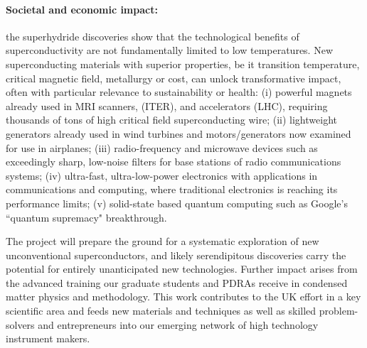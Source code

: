 \paragraph{Societal and economic impact:}
the superhydride discoveries show that the technological benefits of superconductivity are not fundamentally limited to low temperatures. 
New superconducting materials with superior properties, be it transition temperature,
critical magnetic field, metallurgy or cost, 
can unlock transformative impact, often with particular relevance to sustainability or health: 
(i) powerful magnets already used in MRI scanners, %
  (ITER), and accelerators (LHC), requiring  thousands of tons of high critical field superconducting wire; 
(ii) lightweight generators already used in wind turbines and motors/generators now examined for use in airplanes;   
(iii) radio-frequency and microwave devices such as exceedingly sharp, low-noise filters for base stations of radio communications systems; 
(iv) ultra-fast, ultra-low-power electronics with applications in communications and computing, where traditional electronics is reaching its performance limits; 
(v) solid-state based quantum computing such as Google's ``quantum supremacy" breakthrough.

The project will prepare the ground for a systematic exploration of new unconventional superconductors, and likely serendipitous discoveries carry the potential for entirely unanticipated new technologies. 
Further impact arises from the advanced training our graduate students and PDRAs receive in condensed matter physics and methodology. This
work contributes to the UK effort in a key scientific area and feeds new materials and techniques as well as skilled problem-solvers and
entrepreneurs into our emerging network of high technology instrument
makers.


